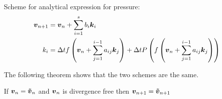 Scheme for analytical expression for pressure:
\begin{subequations}
\begin{align}
	{\boldsymbol {v}}_{n+1}&={\boldsymbol {v}}_{n}+\sum_{i=1}^{s}b_{i}{\boldsymbol {k}}_{i}\\
	k_{i}&=\Delta t f\left({\boldsymbol {v}}_{n}+\sum_{j=1}^{i-1}a_{ij}{\boldsymbol {k}}_{j}\right)+\Delta t P\left(f\left({\boldsymbol {v}}_{n}+\sum_{j=1}^{i-1}a_{ij}{\boldsymbol {k}}_{j}\right)\right)
\end{align}
\end{subequations}

The following theorem shows that the two schemes are the same.

\begin{theorem}
If ${\boldsymbol {v}}_{n}={\boldsymbol {\tilde{v}}}_{n}$ and ${\boldsymbol {v}}_n$ is divergence free then ${\boldsymbol {v}}_{n+1}={\boldsymbol {\tilde{v}}}_{n+1}$ 
\end{theorem}
